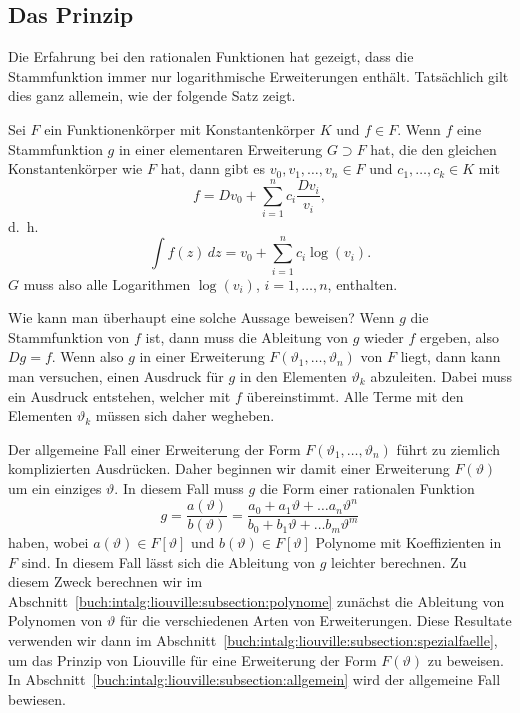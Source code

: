 %
%
\subsection{Das Prinzip 
\label{buch:intalg:liouville:subsection:prinzip}}
Die Erfahrung bei den rationalen Funktionen hat gezeigt, dass die
Stammfunktion immer nur logarithmische Erweiterungen enthält.
Tatsächlich gilt dies ganz allemein, wie der folgende Satz zeigt.

\begin{satz}
Sei $F$ ein Funktionenkörper mit Konstantenkörper $K$ und $f\in F$.
Wenn $f$ eine Stammfunktion $g$ in einer elementaren Erweiterung
$G\supset F$ hat, die den gleichen Konstantenkörper wie $F$ hat, dann
gibt es $v_0,v_1,\dots,v_n\in F$ und $c_1,\dots,c_k\in K$ mit
\begin{equation}
f
=
Dv_0
+
\sum_{i=1}^n c_i\frac{Dv_i}{v_i},
\end{equation}
d.~h.~
\[
\int f(z)\,dz
=
v_0
+ 
\sum_{i=1}^n c_i \log(v_i).
\]
$G$ muss also alle Logarithmen $\log(v_i)$, $i=1,\dots,n$, enthalten.
\end{satz}

Wie kann man überhaupt eine solche Aussage beweisen?
Wenn $g$ die Stammfunktion von $f$ ist, dann muss die Ableitung
von $g$ wieder $f$ ergeben, also $Dg=f$.
Wenn also $g$ in einer Erweiterung $F(\vartheta_1,\dots,\vartheta_n)$
von $F$ liegt, dann kann man versuchen, einen Ausdruck für $g$ in den
Elementen $\vartheta_k$ abzuleiten.
Dabei muss ein Ausdruck entstehen, welcher mit $f$ übereinstimmt.
Alle Terme mit den Elementen $\vartheta_k$ müssen sich daher wegheben.

Der allgemeine Fall einer Erweiterung der Form
$F(\vartheta_1,\dots,\vartheta_n)$ führt zu ziemlich komplizierten
Ausdrücken.
Daher beginnen wir damit einer Erweiterung $F(\vartheta)$ um ein
einziges $\vartheta$.
In diesem Fall muss $g$ die Form einer rationalen Funktion
\begin{equation}
g
=
\frac{a(\vartheta)}{b(\vartheta)} 
=
\frac{
a_0 + a_1\vartheta + \dots a_n\vartheta^n
}{
b_0 + b_1\vartheta + \dots b_m\vartheta^m
}
\label{buch:intalg:liouville:eqn:bruch}
\end{equation}
haben, wobei $a(\vartheta)\in F[\vartheta]$ und
$b(\vartheta)\in F[\vartheta]$ Polynome mit Koeffizienten in $F$ sind.
In diesem Fall lässt sich die Ableitung von $g$ leichter berechnen.
Zu diesem Zweck berechnen wir im
Abschnitt~\ref{buch:intalg:liouville:subsection:polynome}
zunächst die Ableitung von Polynomen von $\vartheta$ für die
verschiedenen Arten von Erweiterungen.
Diese Resultate verwenden wir dann im
Abschnitt~\ref{buch:intalg:liouville:subsection:spezialfaelle},
um das Prinzip von Liouville für eine Erweiterung der Form $F(\vartheta)$
zu beweisen.
In Abschnitt~\ref{buch:intalg:liouville:subsection:allgemein}
wird der allgemeine Fall bewiesen.

